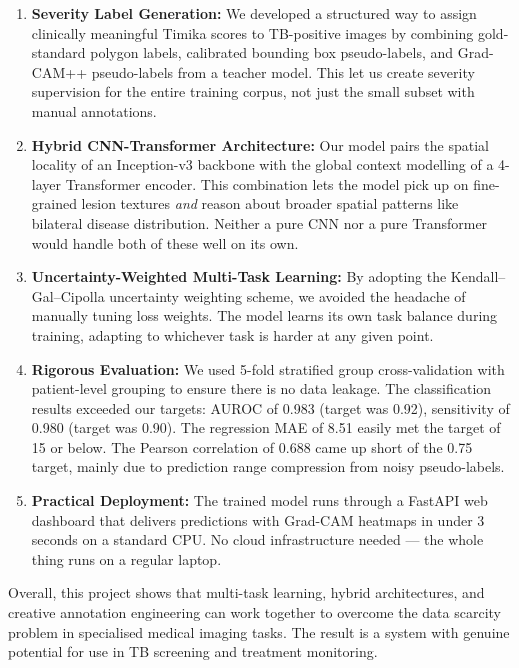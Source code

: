 \documentclass[12pt]{report}
\begin{document}
\begin{enumerate}
    \item \textbf{Severity Label Generation:} We developed a structured way to assign clinically meaningful Timika scores to TB-positive images by combining gold-standard polygon labels, calibrated bounding box pseudo-labels, and Grad-CAM++ pseudo-labels from a teacher model. This let us create severity supervision for the entire training corpus, not just the small subset with manual annotations.

    \item \textbf{Hybrid CNN-Transformer Architecture:} Our model pairs the spatial locality of an Inception-v3 backbone with the global context modelling of a 4-layer Transformer encoder. This combination lets the model pick up on fine-grained lesion textures \textit{and} reason about broader spatial patterns like bilateral disease distribution. Neither a pure CNN nor a pure Transformer would handle both of these well on its own.

    \item \textbf{Uncertainty-Weighted Multi-Task Learning:} By adopting the Kendall--Gal--Cipolla uncertainty weighting scheme, we avoided the headache of manually tuning loss weights. The model learns its own task balance during training, adapting to whichever task is harder at any given point.

    \item \textbf{Rigorous Evaluation:} We used 5-fold stratified group cross-validation with patient-level grouping to ensure there is no data leakage. The classification results exceeded our targets: AUROC of 0.983 (target was 0.92), sensitivity of 0.980 (target was 0.90). The regression MAE of 8.51 easily met the target of 15 or below. The Pearson correlation of 0.688 came up short of the 0.75 target, mainly due to prediction range compression from noisy pseudo-labels.

    \item \textbf{Practical Deployment:} The trained model runs through a FastAPI web dashboard that delivers predictions with Grad-CAM heatmaps in under 3 seconds on a standard CPU. No cloud infrastructure needed --- the whole thing runs on a regular laptop.
\end{enumerate}

Overall, this project shows that multi-task learning, hybrid architectures, and creative annotation engineering can work together to overcome the data scarcity problem in specialised medical imaging tasks. The result is a system with genuine potential for use in TB screening and treatment monitoring.
\end{document}
